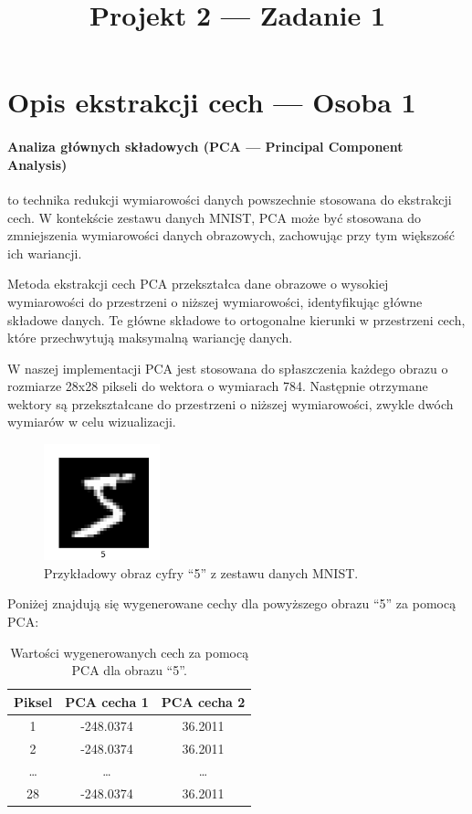 \documentclass[10pt]{article}
\title{Projekt 2 --- Zadanie 1}
\begin{document}
\maketitle
\normalsize
\section{Opis ekstrakcji cech --- Osoba 1}


\paragraph*{Analiza głównych składowych (PCA --- Principal Component Analysis)} to technika redukcji wymiarowości danych powszechnie stosowana do ekstrakcji cech. W kontekście zestawu danych MNIST, PCA może być stosowana do zmniejszenia wymiarowości danych obrazowych, zachowując przy tym większość ich wariancji.

Metoda ekstrakcji cech PCA przekształca dane obrazowe o wysokiej wymiarowości do przestrzeni o niższej wymiarowości, identyfikując główne składowe danych. Te główne składowe to ortogonalne kierunki w przestrzeni cech, które przechwytują maksymalną wariancję danych.

W naszej implementacji PCA jest stosowana do spłaszczenia każdego obrazu o rozmiarze 28x28 pikseli do wektora o wymiarach 784. Następnie otrzymane wektory są przekształcane do przestrzeni o niższej wymiarowości, zwykle dwóch wymiarów w celu wizualizacji.

\begin{figure}[h]
    \centering
    \includegraphics[width=0.3\textwidth]{img/MNIST_1_cyfra}
    \caption{Przykładowy obraz cyfry ``5'' z zestawu danych MNIST.}
\end{figure}

Poniżej znajdują się wygenerowane cechy dla powyższego obrazu ``5'' za pomocą PCA:
\begin{table}[h]
    \centering
    \begin{tabular}{|c|c|c|}
        \toprule
        \textbf{Piksel} & \textbf{PCA cecha 1} & \textbf{PCA cecha 2} \\
        \midrule
        1               & -248.0374            & 36.2011              \\
        2               & -248.0374            & 36.2011              \\
        \ldots          & \ldots               & \ldots               \\
        28              & -248.0374            & 36.2011              \\
        \bottomrule
    \end{tabular}
    \caption{Wartości wygenerowanych cech za pomocą PCA dla obrazu ``5''.}
\end{table}
\end{document}
